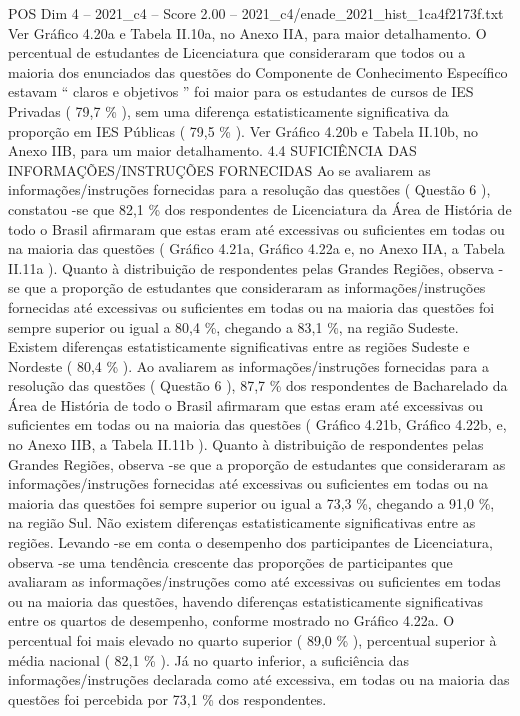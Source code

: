 \begin{textsample}{POS Dim 4 – 2021\_c4 – Score 2.00 – 2021\_c4/enade\_2021\_hist\_1ca4f2173f.txt}
Ver Gráfico 4.20a e Tabela II.10a, no Anexo IIA, para maior detalhamento.
O percentual de estudantes de Licenciatura que consideraram que todos ou a maioria dos enunciados das questões do Componente de Conhecimento Específico estavam “ claros e objetivos ” foi maior para os estudantes de cursos de IES Privadas ( 79,7 \% ), sem uma diferença estatisticamente significativa da proporção em IES Públicas ( 79,5 \% ).
Ver Gráfico 4.20b e Tabela II.10b, no Anexo IIB, para um maior detalhamento. 4.4 SUFICIÊNCIA DAS INFORMAÇÕES/INSTRUÇÕES FORNECIDAS Ao se avaliarem as informações/instruções fornecidas para a resolução das questões ( Questão 6 ), constatou -se que 82,1 \% dos respondentes de Licenciatura da Área de História de todo o Brasil afirmaram que estas eram até excessivas ou suficientes em todas ou na maioria das questões ( Gráfico 4.21a, Gráfico 4.22a e, no Anexo IIA, a Tabela II.11a ).
Quanto à distribuição de respondentes pelas Grandes Regiões, observa -se que a proporção de estudantes que consideraram as informações/instruções fornecidas até excessivas ou suficientes em todas ou na maioria das questões foi sempre superior ou igual a 80,4 \%, chegando a 83,1 \%, na região Sudeste.
Existem diferenças estatisticamente significativas entre as regiões Sudeste e Nordeste ( 80,4 \% ).
Ao avaliarem as informações/instruções fornecidas para a resolução das questões ( Questão 6 ), 87,7 \% dos respondentes de Bacharelado da Área de História de todo o Brasil afirmaram que estas eram até excessivas ou suficientes em todas ou na maioria das questões ( Gráfico 4.21b, Gráfico 4.22b, e, no Anexo IIB, a Tabela II.11b ).
Quanto à distribuição de respondentes pelas Grandes Regiões, observa -se que a proporção de estudantes que consideraram as informações/instruções fornecidas até excessivas ou suficientes em todas ou na maioria das questões foi sempre superior ou igual a 73,3 \%, chegando a 91,0 \%, na região Sul.
Não existem diferenças estatisticamente significativas entre as regiões.
Levando -se em conta o desempenho dos participantes de Licenciatura, observa -se uma tendência crescente das proporções de participantes que avaliaram as informações/instruções como até excessivas ou suficientes em todas ou na maioria das questões, havendo diferenças estatisticamente significativas entre os quartos de desempenho, conforme mostrado no Gráfico 4.22a.
O percentual foi mais elevado no quarto superior ( 89,0 \% ), percentual superior à média nacional ( 82,1 \% ).
Já no quarto inferior, a suficiência das informações/instruções declarada como até excessiva, em todas ou na maioria das questões foi percebida por 73,1 \% dos respondentes.

\end{textsample}
